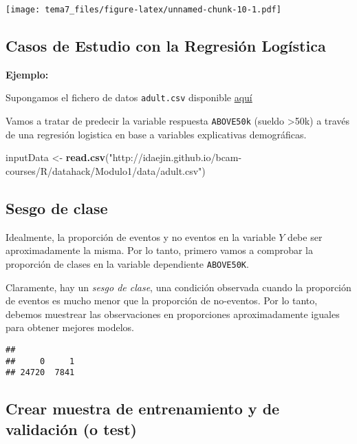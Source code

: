 \documentclass[]{article}
\newenvironment{Shaded}{\begin{snugshade}}{\end{snugshade}}
\newcommand{\KeywordTok}[1]{\textcolor[rgb]{0.13,0.29,0.53}{\textbf{{#1}}}}
\newcommand{\StringTok}[1]{\textcolor[rgb]{0.31,0.60,0.02}{{#1}}}
\newcommand{\NormalTok}[1]{{#1}}
\numberwithin{equation}{section}
\begin{document}
\texttt{[image: tema7\_files/figure-latex/unnamed-chunk-10-1.pdf]}

\subsection{Casos de Estudio con la Regresión
Logística}\label{casos-de-estudio-con-la-regresion-logistica}

\textbf{Ejemplo:}

Supongamos el fichero de datos \texttt{adult.csv} disponible
\href{data/adult.csv}{aquí}

Vamos a tratar de predecir la variable respuesta \texttt{ABOVE50k}
(sueldo \textgreater{}50k) a través de una regresión logistica en base a
variables explicativas demográficas.

\begin{Shaded}
\begin{Highlighting}[]
\NormalTok{inputData <-}\StringTok{ }\KeywordTok{read.csv}\NormalTok{(}\StringTok{"http://idaejin.github.io/bcam-courses/R/datahack/Modulo1/data/adult.csv"}\NormalTok{)}
\end{Highlighting}
\end{Shaded}

\subsection{Sesgo de clase}\label{sesgo-de-clase}

Idealmente, la proporción de eventos y no eventos en la variable \(Y\)
debe ser aproximadamente la misma. Por lo tanto, primero vamos a
comprobar la proporción de clases en la variable dependiente
\texttt{ABOVE50K}.

Claramente, hay un \emph{sesgo de clase}, una condición observada cuando
la proporción de eventos es mucho menor que la proporción de no-eventos.
Por lo tanto, debemos muestrear las observaciones en proporciones
aproximadamente iguales para obtener mejores modelos.

\begin{Shaded}
\end{Shaded}

\begin{verbatim}
## 
##     0     1 
## 24720  7841
\end{verbatim}

\subsection{Crear muestra de entrenamiento y de validación (o
test)}\label{crear-muestra-de-entrenamiento-y-de-validacion-o-test}
\end{document}
